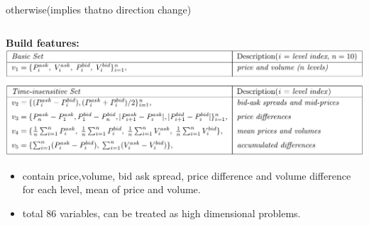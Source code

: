 \documentclass[xcolor={x11names,svgnames,dvipsnames}]{beamer}
\begin{document}
\begin{frame}
\begin{columns}
\begin{column}{.5\textwidth}
\begin{itemize}
			\\
			\subitem\textbullet  otherwise(implies that\alert{no direction} change)
			\end{itemize}
		\end{column}
	\end{columns}
\end{frame}

\begin{frame}
\textbf{Build features:}\\
	\includegraphics[width=1\textwidth, height=0.5\textheight]{features.png}
\begin{itemize}
			\item contain \alert{price,volume, bid ask spread, price difference and volume difference for each level, mean of price and volume.}  
            \item total 86 variables,  can be treated as high dimensional problems.
\end{itemize}
\end{frame}
\end{document}
